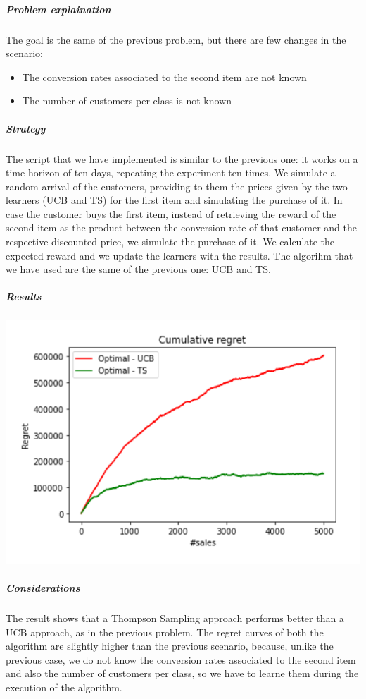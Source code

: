 \subparagraph*{Problem explaination}
The goal is the same of the previous problem, but there are few changes in the scenario:
\begin{itemize}
	\item The conversion rates associated to the second item are not known
	\item The number of customers per class is not known
\end{itemize}
\subparagraph*{Strategy}
The script that we have implemented is similar to the previous one: it works on a time horizon of ten days, repeating the experiment ten times. We simulate a random arrival of the customers, providing to them the prices given by the two learners (UCB and TS) for the first item and simulating the purchase of it. In case the customer buys the first item, instead of retrieving the reward of the second item as the product  between the conversion rate of that customer and the respective discounted price, 
we simulate the purchase of it. We calculate the expected reward and we update the learners with the results. 
The algorihm that we have used are the same of the previous one: UCB and TS.

\subparagraph*{Results}
\begin{center}
	\includegraphics[scale=1.2]{Images/n4}
\end{center}
\subparagraph*{Considerations}
The result shows that a Thompson Sampling approach performs better than a UCB approach, as in the previous problem. The regret curves of both the algorithm are slightly higher than the previous scenario, because, unlike the previous case, we do not know the conversion rates associated to the second item and also the number of customers per class, so we have to learne them during the execution of the algorithm.
